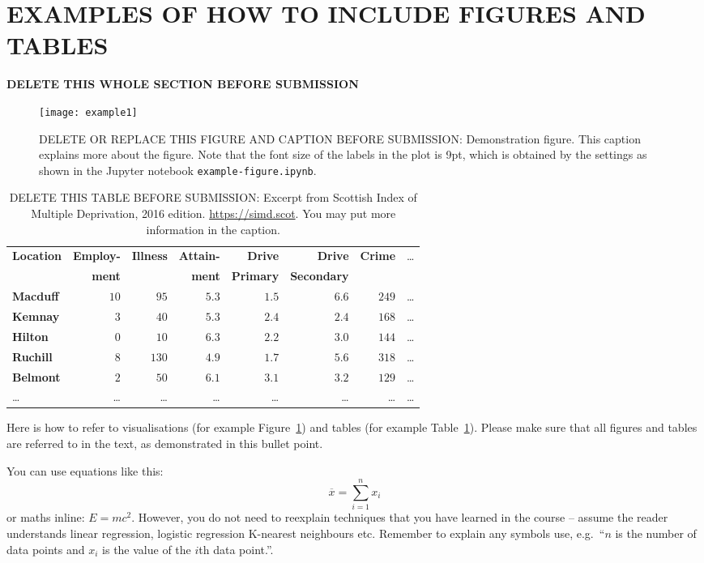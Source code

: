 \documentclass[11pt,a4paper]{article}
\begin{document}
\section{EXAMPLES OF HOW TO INCLUDE FIGURES AND TABLES}

\textbf{DELETE THIS WHOLE SECTION BEFORE SUBMISSION}

\begin{figure}[t]
  \centering
  \texttt{[image: example1]}
  \caption{DELETE OR REPLACE THIS FIGURE AND CAPTION BEFORE
    SUBMISSION: Demonstration figure. This caption explains more about
    the figure. Note that the font size of the labels in the plot is
    9pt, which is obtained by the settings as shown in the Jupyter
    notebook \texttt{example-figure.ipynb}.}
  \label{fds-project-template:fig:example1}
\end{figure}


\begin{table}[b]
  \caption{DELETE THIS TABLE BEFORE SUBMISSION: Excerpt from Scottish Index of Multiple Deprivation, 2016 edition.
    \url{https://simd.scot}. You may put more information in the caption.}
  \label{tab:example1}
\begin{tabular}{lrrrrrrr}
\hline\hline
\textbf{Location}&\textbf{Employ-}&\textbf{Illness}&\textbf{Attain-}&\textbf{Drive}  &\textbf{Drive}    &\textbf{Crime}&\dots\\
                 &\textbf{ment}   &                &\textbf{ment}   &\textbf{Primary}&\textbf{Secondary}&              &\\
\hline
\textbf{Macduff}&$10$&$ 95$&$5.3$&$1.5$&$6.6$&$249$&\dots\tabularnewline
\textbf{Kemnay}&$ 3$&$ 40$&$5.3$&$2.4$&$2.4$&$168$&\dots\tabularnewline
\textbf{Hilton}&$ 0$&$ 10$&$6.3$&$2.2$&$3.0$&$144$&\dots\tabularnewline
\textbf{Ruchill}&$ 8$&$130$&$4.9$&$1.7$&$5.6$&$318$&\dots\tabularnewline
\textbf{Belmont}&$ 2$&$ 50$&$6.1$&$3.1$&$3.2$&$129$&\dots\tabularnewline
\dots&\dots&\dots&\dots&\dots&\dots&\dots&\dots\tabularnewline
\hline
\end{tabular}
\end{table}

Here is how to refer to visualisations (for example
Figure~\ref{fds-project-template:fig:example1}) and tables (for
example Table~\ref{tab:example1}). Please make sure that all figures
and tables are referred to in the text, as demonstrated in this bullet
point.

You can use equations like this:
\begin{equation}
  \label{fds-project-template:eq:1}
  \overline{x} = \sum_{i=1}^n x_i
\end{equation}
or maths inline: $E=mc^2$. However, you do not need to reexplain techniques that you have learned in the course -- assume the reader understands linear regression, logistic regression K-nearest neighbours etc.  Remember to explain any symbols use, e.g.~``$n$ is the number of data points and $x_i$ is the value of the $i$th data point.''.




\end{document}
